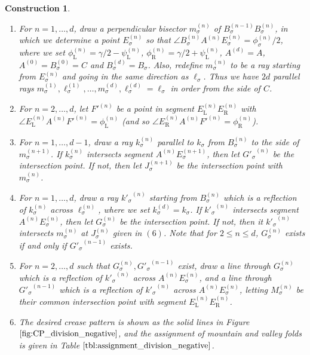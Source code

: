 \documentclass[11pt]{amsart}
\newtheorem{construction}[theorem]{Construction}
\numberwithin{equation}{section}
\numberwithin{theorem}{section}
\newcommand{\Lt}{\ensuremath{\mathrm{L}}}
\newcommand{\Rt}{\ensuremath{\mathrm{R}}}
\begin{document}
\begin{construction}
\begin{enumerate}
Also, if we have $p_1=\dots =p_d=1$ (equal division) and $\psi_\Lt^{(2)}=\dots =\psi_\Lt^{(n)}=\psi_\Lt$, then $\eqref{ineq:psi_n}$ is simplified as
\begin{equation*}
\frac{r^2+3}{4r}\leqslant\cos\psi_\Lt .
\end{equation*}
\item For $n=1,\dots ,d$, draw a perpendicular bisector $m_\sigma^{(n)}$ of $B_\sigma^{(n-1)}B_\sigma^{(n)}$,
in which we determine a point $E_\sigma^{(n)}$ so that $\angle B_\sigma^{(n)}A^{(n)}E_\sigma^{(n)}=\phi_\sigma^{(n)}/2$,
where we set $\phi_\Lt^{(n)}=\gamma /2-\psi_\Lt^{(n)}$, $\phi_\Rt^{(n)}=\gamma /2+\psi_\Lt^{(n)}$,
$A^{(d)}=A$, $A^{(0)}=B_\sigma^{(0)}=C$ and $B_\sigma^{(d)}=B_\sigma$.
Also, redefine $m_\sigma^{(n)}$ to be a ray starting from $E_\sigma^{(n)}$ and going in the same direction as $\ell_\sigma$.
Thus we have $2d$ parallel rays $m_\sigma^{(1)},\ell_\sigma^{(1)},\dots ,m_\sigma^{(d)},\ell_\sigma^{(d)}=\ell_\sigma$ in order from the side of $C$.
\item For $n=2,\dots ,d$, let ${F'}^{(n)}$ be a point in segment $E_\Lt^{(n)}E_\Rt^{(n)}$ with $\angle E_\Lt^{(n)}A^{(n)}{F'}^{(n)}=\phi_\Lt^{(n)}$
(and so $\angle E_\Rt^{(n)}A^{(n)}{F'}^{(n)}=\phi_\Rt^{(n)}$).
\item For $n=1,\dots ,d-1$, draw a ray $k_\sigma^{(n)}$ parallel to $k_\sigma$ from $B_\sigma^{(n)}$ to the side of $m_\sigma^{(n+1)}$.
If $k_\sigma^{(n)}$ intersects segment $A^{(n)}E_\sigma^{(n+1)}$, then let ${G'_\sigma}^{\! (n)}$ be the intersection point.
If not, then let $J_\sigma^{(n+1)}$ be the intersection point with $m_\sigma^{(n)}$.
\item For $n=1,\dots ,d$, draw a ray ${k'_\sigma}^{\! (n)}$ starting from $B_\sigma^{(n)}$
which is a reflection of $k_\sigma^{(n)}$ across $\ell_\sigma^{(n)}$, where we set $k_\sigma^{(d)}=k_\sigma$.
If ${k'_\sigma}^{\! (n)}$ intersects segment $A^{(n)}E_\sigma^{(n)}$, then let $G_\sigma^{(n)}$ be the intersection point.
If not, then it ${k'_\sigma}^{\! (n)}$ intersects $m_\sigma^{(n)}$ at $J_\sigma^{(n)}$ given in $(6)$.
Note that for $2\leqslant n\leqslant d$, $G_\sigma^{(n)}$ exists if and only if ${G'_\sigma}^{\! (n-1)}$ exists.
\item For $n=2,\dots ,d$ such that $G_\sigma^{(n)},{G'_\sigma}^{\! (n-1)}$ exist,
draw a line through $G_\sigma^{(n)}$ which is a reflection of ${k'_\sigma}^{\! (n)}$ across $A^{(n)}E_\sigma^{(n)}$,
and a line through ${G'_\sigma}^{\! (n-1)}$ which is a reflection of ${k'_\sigma}^{\! (n)}$ across $A^{(n)}E_\sigma^{(n)}$,
letting $M_\sigma^{(n)}$ be their common intersection point with segment $E_\Lt^{(n)} E_\Rt^{(n)}$.
\item The desired crease pattern is shown as the solid lines in Figure $\ref{fig:CP_division_negative}$,
and the assignment of mountain and valley folds is given in Table $\ref{tbl:assignment_division_negative}$.
\end{enumerate}
\end{construction}
\end{document}
